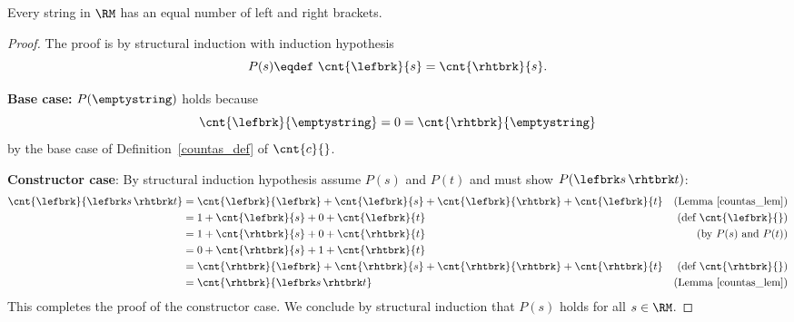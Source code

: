 \begin{lemma*}%
Every string in $\RM$ has an equal number of left and right brackets.

\begin{proof}
The proof is by structural induction with induction hypothesis
\[
P(s) \eqdef\  \cnt{\lefbrk}{s} = \cnt{\rhtbrk}{s}.
\]

\textbf{Base case:} $P(\emptystring)$ holds because
\[
\cnt{\lefbrk}{\emptystring} = 0 = \cnt{\rhtbrk}{\emptystring}
\]
by the base case of Definition~\ref{countas_def} of $\cnt{c}{}$.

\textbf{Constructor case}: By structural induction hypothesis assume
$P(s)$ and $P(t)$ and must show $P(\lefbrk s\,\rhtbrk t)$:
\begin{align*}
\cnt{\lefbrk}{\lefbrk s\,\rhtbrk t}
    & = \cnt{\lefbrk}{\lefbrk} + \cnt{\lefbrk}{s}
        +\cnt{\lefbrk}{\rhtbrk}+ \cnt{\lefbrk}{t}
         & \text{(Lemma~\ref{countas_lem})}\\
    & = 1 + \cnt{\lefbrk}{s} + 0 + \cnt{\lefbrk}{t}
         & \text{(def $\cnt{\lefbrk}{}$)}\\
    & = 1 + \cnt{\rhtbrk}{s} + 0 + \cnt{\rhtbrk}{t}
         & \text{(by $P(s)$ and $P(t)$)}\\
    & = 0 + \cnt{\rhtbrk}{s} + 1 + \cnt{\rhtbrk}{t}\\
    & = \cnt{\rhtbrk}{\lefbrk} + \cnt{\rhtbrk}{s}
        +\cnt{\rhtbrk}{\rhtbrk}+ \cnt{\rhtbrk}{t}
         & \text{(def $\cnt{\rhtbrk}{}$)}\\
    & = \cnt{\rhtbrk}{\lefbrk s\,\rhtbrk t}
            & \text{(Lemma~\ref{countas_lem})}
\end{align*}
This completes the proof of the constructor case.  We conclude by
structural induction that $P(s)$ holds for all $s \in\RM$.
\end{proof}
\end{lemma*}


\iffalse

The \term{depth} of a matched string is defined recursively as follows
\begin{definition}
The \emph{depth}, $d(s)$, of a string, $s \in\RM$, is defined
recursively by the rules:
\begin{itemize}
\item $d(\emptystring) \eqdef\  0.$
\item $d(\lefbrk s\,\rhtbrk t)
    \eqdef\ \max \set{d(s) + 1, d(t)}$
\end{itemize}
\end{definition}
\fi

